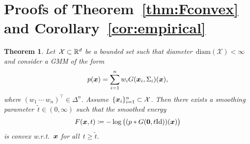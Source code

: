 \documentclass{article}
\newcommand{\X}{\mathcal{X}}
\newcommand{\id}{\mathrm{Id}}
\renewcommand{\vec}[1]{\mathbf{#1}}
\newcommand{\diameter}{\mathrm{diam}}
\theoremstyle{plain}
\newtheorem{theorem}{Theorem}[section]
\theoremstyle{definition}
\theoremstyle{remark}
\begin{document}
\section{Proofs of Theorem~\ref{thm:Fconvex} and Corollary~\ref{cor:empirical}} \label{apdx:proofs}

\begin{theorem}
Let~$\X\subset\R^d$ be a bounded set such that diameter~$\diameter(\X)<\infty$ and consider a GMM of the form
\[
p({\bm{x}}) = \sum_{i=1}^n w_i G({\bm{x}}_i,\Sigma_i)({\bm{x}}),
\]
where $(w_1\ \cdots \ w_n)^\top\in\Delta^n$. Assume~$\{\vx_i\}_{i=1}^n\subset\X$.
Then there exists a smoothing parameter~$\widetilde{t}\in(0,\infty)$ such that the smoothed energy
\[
F(\vx,t)\coloneqq -\log \big( (p \ast G(\vec{0}, t\id))(\vx)\big)
\]
is \emph{convex} w.r.t.~${\bm{x}}$ for all~$t\geq\widetilde{t}$.
\end{theorem}
\end{document}
